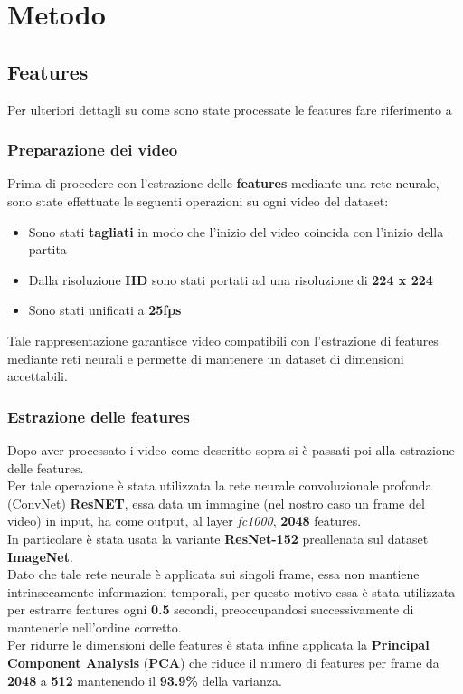 \chapter{Metodo}\label{ch:chapter1}
\section{Features}
Per ulteriori dettagli su come sono state processate le features fare riferimento a \citep{soccerNet}
\subsection{Preparazione dei video }
Prima di procedere con l'estrazione delle \textbf{features} mediante una rete neurale, sono state effettuate le seguenti operazioni su ogni video del dataset:
\begin{itemize}
\item Sono stati \textbf{tagliati} in modo che l'inizio del video coincida con l'inizio della partita
\item Dalla risoluzione \textbf{HD} sono stati portati ad una risoluzione di \textbf{224 x 224}
\item Sono stati unificati a \textbf{25fps}
\end{itemize}
Tale rappresentazione garantisce video compatibili con l'estrazione di features mediante reti neurali e permette di mantenere un dataset di dimensioni accettabili.
\subsection{Estrazione delle features}
Dopo aver processato i video come descritto sopra si è passati poi alla estrazione delle features.
\\Per tale operazione è stata utilizzata la rete neurale convoluzionale profonda (ConvNet) \textbf{ResNET}, essa data un immagine (nel nostro caso un frame del video) in input, ha come output, al layer \textit{fc1000}, \textbf{2048} features.
\\In particolare è stata usata la variante \textbf{ResNet-152} preallenata sul dataset \textbf{ImageNet}.
\\Dato che tale rete neurale è applicata sui singoli frame, essa non mantiene intrinsecamente informazioni temporali, per questo motivo essa è stata utilizzata per estrarre features ogni \textbf{0.5} secondi, preoccupandosi successivamente di mantenerle nell'ordine corretto.
\\Per ridurre le dimensioni delle features è stata infine applicata la \textbf{Principal Component Analysis} (\textbf{PCA}) che riduce il numero di features per frame da \textbf{2048} a \textbf{512} mantenendo il \textbf{93.9\%} della varianza.

